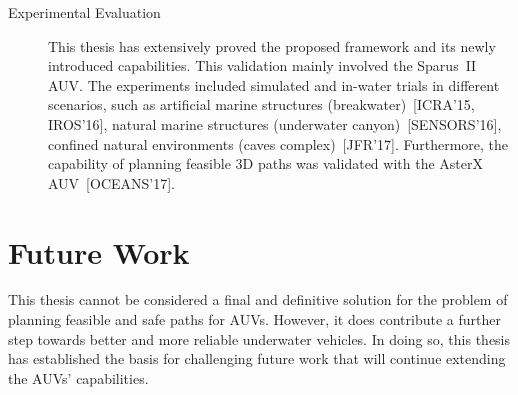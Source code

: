 \begin{description}
\item[Experimental Evaluation] This thesis has extensively proved the proposed
framework and its newly introduced capabilities. This validation mainly involved
the Sparus~II \ac{AUV}. The experiments included simulated and in-water trials
in different scenarios, such as artificial marine structures
(breakwater)~[ICRA'15, IROS'16], natural marine structures (underwater
canyon)~[SENSORS'16], confined natural environments (caves complex)~[JFR'17].
Furthermore, the capability of planning feasible \ac{3D} paths was validated
with the AsterX \ac{AUV}~[OCEANS'17].

\end{description}

\section{Future Work}

This thesis cannot be considered a final and definitive solution for the problem
of planning feasible and safe paths for \acp{AUV}. However, it does contribute a
further step towards better and more reliable underwater vehicles. In doing so,
this thesis has established the basis for challenging future work that will
continue extending the \acp{AUV}' capabilities.

